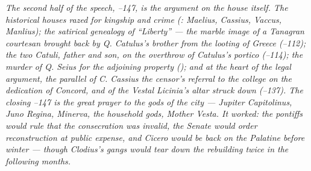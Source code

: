 \textit{The second half of the speech, --147, is the argument on the house itself. The
historical houses razed for kingship and crime
(: Maelius, Cassius, Vaccus, Manlius);
the satirical genealogy of ``Liberty'' --- the marble image
of a Tanagran courtesan brought back by Q. Catulus's brother
from the looting of Greece (--112); the two
Catuli, father and son, on the overthrow of Catulus's
portico (--114); the murder of Q. Seius for
the adjoining property (); and at the heart
of the legal argument, the parallel of C. Cassius the
censor's referral to the college on the dedication of
Concord, and of the Vestal Licinia's altar struck down
(--137). The closing --147
is the great prayer to the gods of the city --- Jupiter
Capitolinus, Juno Regina, Minerva, the household gods, Mother
Vesta. It worked: the pontiffs would rule that the
consecration was invalid, the Senate would order
reconstruction at public expense, and Cicero would be back
on the Palatine before winter --- though Clodius's gangs
would tear down the rebuilding twice in the following
months.}
